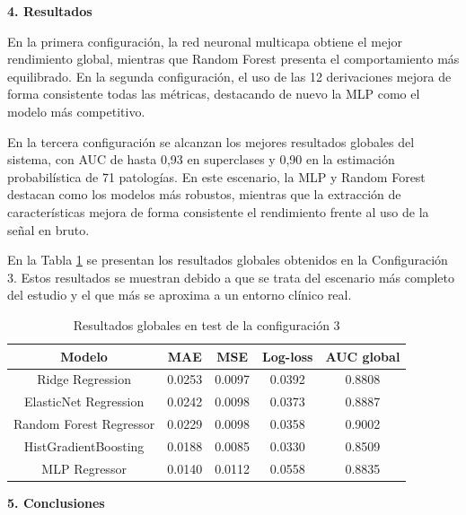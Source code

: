 \documentclass[12pt,a4paper,twoside]{book}
\begin{document}
\vspace{0.5cm}

\noindent \large \textbf{4. Resultados}
\vspace{0.3cm}

En la primera configuración, la red neuronal multicapa obtiene el mejor rendimiento global, mientras que Random Forest presenta el comportamiento más equilibrado. 
En la segunda configuración, el uso de las 12 derivaciones mejora de forma consistente todas las métricas, destacando de nuevo la MLP como el modelo más competitivo.

En la tercera configuración se alcanzan los mejores resultados globales del sistema, con AUC de hasta 0,93 en superclases y 0,90 en la estimación probabilística de 71 patologías. 
En este escenario, la MLP y Random Forest destacan como los modelos más robustos, mientras que la extracción de características mejora de forma consistente el rendimiento frente al uso de la señal en bruto.

En la Tabla \ref{tab:analisis-global-config3-resumen} se presentan los resultados globales obtenidos en la Configuración 3. 
Estos resultados se muestran debido a que se trata del escenario más completo del estudio y el que más se aproxima a un entorno clínico real.

\begin{table}[H]
	\centering
	\begin{tabular}{|c|c|c|c|c|}
	\hline
	\textbf{Modelo} & \textbf{MAE} & \textbf{MSE} & \textbf{Log-loss} & \textbf{AUC global} \\
	\hline
	Ridge Regression            & 0.0253 & 0.0097 & 0.0392 & 0.8808 \\
	ElasticNet Regression       & 0.0242 & 0.0098 & 0.0373 & 0.8887 \\
	Random Forest Regressor     & 0.0229 & 0.0098 & 0.0358 & 0.9002 \\
	HistGradientBoosting        & 0.0188 & 0.0085 & 0.0330 & 0.8509 \\
	MLP Regressor               & 0.0140 & 0.0112 & 0.0558 & 0.8835 \\
	\hline
	\end{tabular}
	\caption{Resultados globales en test de la configuración 3}
	\label{tab:analisis-global-config3-resumen}
\end{table}

\vspace{0.5cm}

\noindent \large \textbf{5. Conclusiones}
\vspace{0.3cm}
\end{document}

